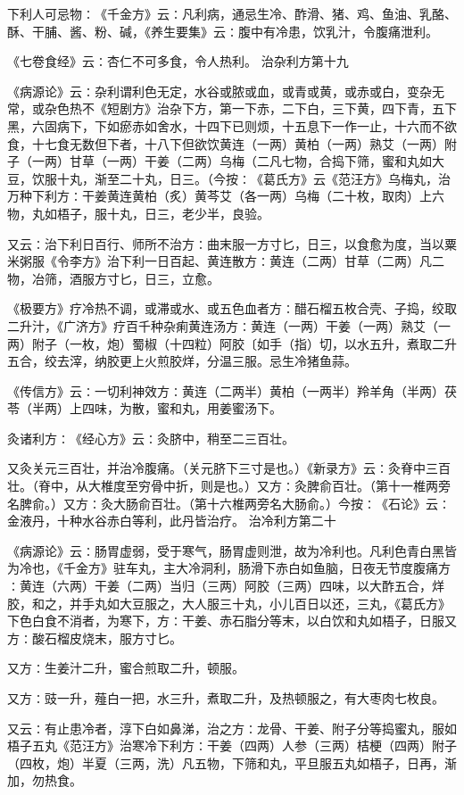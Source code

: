 \documentclass[a4paper,12pt,UTF8,twoside]{ctexbook}
\begin{document}
下利人可忌物∶《千金方》云∶凡利病，通忌生冷、酢滑、猪、鸡、鱼油、乳酪、酥、干脯、酱、粉、碱，《养生要集》云∶腹中有冷患，饮乳汁，令腹痛泄利。

《七卷食经》云∶杏仁不可多食，令人热利。
治杂利方第十九

《病源论》云∶杂利谓利色无定，水谷或脓或血，或青或黄，或赤或白，变杂无常，或杂色热不《短剧方》治杂下方，第一下赤，二下白，三下黄，四下青，五下黑，六固病下，下如瘀赤如舍水，十四下已则烦，十五息下一作一止，十六而不欲食，十七食无数但下者，十八下但欲饮黄连（一两）黄柏（一两）熟艾（一两）附子（一两）甘草（一两）干姜（二两）乌梅（二凡七物，合捣下筛，蜜和丸如大豆，饮服十丸，渐至二十丸，日三。（今按∶《葛氏方》云《范汪方》乌梅丸，治万种下利方∶干姜黄连黄柏（炙）黄芩艾（各一两）乌梅（二十枚，取肉）上六物，丸如梧子，服十丸，日三，老少半，良验。

又云∶治下利日百行、师所不治方∶曲末服一方寸匕，日三，以食愈为度，当以粟米粥服《令李方》治下利一日百起、黄连散方∶黄连（二两）甘草（二两）凡二物，冶筛，酒服方寸匕，日三，立愈。

《极要方》疗冷热不调，或滞或水、或五色血者方∶醋石榴五枚合壳、子捣，绞取二升汁，《广济方》疗百千种杂痢黄连汤方∶黄连（一两）干姜（一两）熟艾（一两）附子（一枚，炮）蜀椒（十四粒）阿胶〔如手（指）切，以水五升，煮取二升五合，绞去滓，纳胶更上火煎胶烊，分温三服。忌生冷猪鱼蒜。

《传信方》云∶一切利神效方∶黄连（二两半）黄柏（一两半）羚羊角（半两）茯苓（半两）上四味，为散，蜜和丸，用姜蜜汤下。

灸诸利方∶《经心方》云∶灸脐中，稍至二三百壮。

又灸关元三百壮，并治冷腹痛。（关元脐下三寸是也。）《新录方》云∶灸脊中三百壮。（脊中，从大椎度至穷骨中折，则是也。）又方∶灸脾俞百壮。（第十一椎两旁名脾俞。）又方∶灸大肠俞百壮。（第十六椎两旁名大肠俞。）今按∶《石论》云∶金液丹，十种水谷赤白等利，此丹皆治疗。
治冷利方第二十

《病源论》云∶肠胃虚弱，受于寒气，肠胃虚则泄，故为冷利也。凡利色青白黑皆为冷也，《千金方》驻车丸，主大冷洞利，肠滑下赤白如鱼脑，日夜无节度腹痛方∶黄连（六两）干姜（二两）当归（三两）阿胶（三两）四味，以大酢五合，烊胶，和之，并手丸如大豆服之，大人服三十丸，小儿百日以还，三丸，《葛氏方》下色白食不消者，为寒下，方∶干姜、赤石脂分等末，以白饮和丸如梧子，日服又方∶酸石榴皮烧末，服方寸匕。

又方∶生姜汁二升，蜜合煎取二升，顿服。

又方∶豉一升，薤白一把，水三升，煮取二升，及热顿服之，有大枣肉七枚良。

又云∶有止患冷者，淳下白如鼻涕，治之方∶龙骨、干姜、附子分等捣蜜丸，服如梧子五丸《范汪方》治寒冷下利方∶干姜（四两）人参（三两）桔梗（四两）附子（四枚，炮）半夏（三两，洗）凡五物，下筛和丸，平旦服五丸如梧子，日再，渐加，勿热食。
\end{document}
